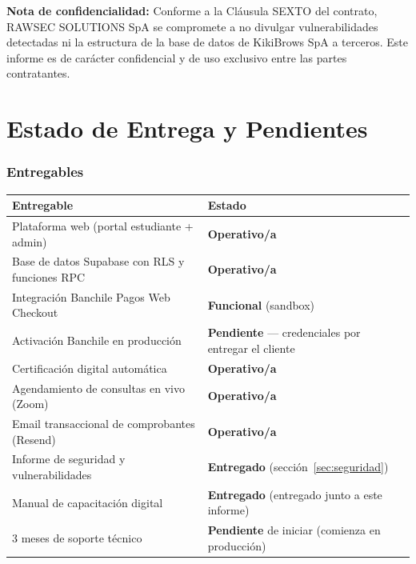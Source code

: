 \documentclass[a4paper,11pt]{article}
\newcommand{\entregado}{\textcolor{checkgreen}{\textbf{Entregado}}}
\newcommand{\operativo}{\textcolor{checkgreen}{\textbf{Operativo/a}}}
\newcommand{\funcional}{\textcolor{checkgreen}{\textbf{Funcional}}}
\newcommand{\pendiente}{\textcolor{warnorange}{\textbf{Pendiente}}}
\begin{document}
\begin{infobox}
\textbf{Nota de confidencialidad:} Conforme a la Cl\'ausula SEXTO del contrato, RAWSEC
SOLUTIONS SpA se compromete a no divulgar vulnerabilidades detectadas ni la estructura
de la base de datos de KikiBrows SpA a terceros. Este informe es de car\'acter confidencial
y de uso exclusivo entre las partes contratantes.
\end{infobox}


\section{Estado de Entrega y Pendientes}

\subsubsection{Entregables}

\renewcommand{\arraystretch}{1.3}
\begin{longtable}{L{9cm} L{5.5cm}}
\toprule
\textbf{Entregable} & \textbf{Estado} \\
\midrule
\endhead
\bottomrule
\endfoot
Plataforma web (portal estudiante + admin)            & \operativo \\
Base de datos Supabase con RLS y funciones RPC        & \operativo \\
Integraci\'on Banchile Pagos Web Checkout             & \funcional{} (sandbox) \\
Activaci\'on Banchile en producci\'on                 & \pendiente{} --- credenciales por entregar el cliente \\
Certificaci\'on digital autom\'atica                  & \operativo \\
Agendamiento de consultas en vivo (Zoom)              & \operativo \\
Email transaccional de comprobantes (Resend)          & \operativo \\
Informe de seguridad y vulnerabilidades               & \entregado{} (secci\'on~\ref{sec:seguridad}) \\
Manual de capacitaci\'on digital                      & \entregado{} (entregado junto a este informe) \\
3 meses de soporte t\'ecnico                          & \pendiente{} de iniciar (comienza en producci\'on) \\
\end{longtable}
\end{document}
